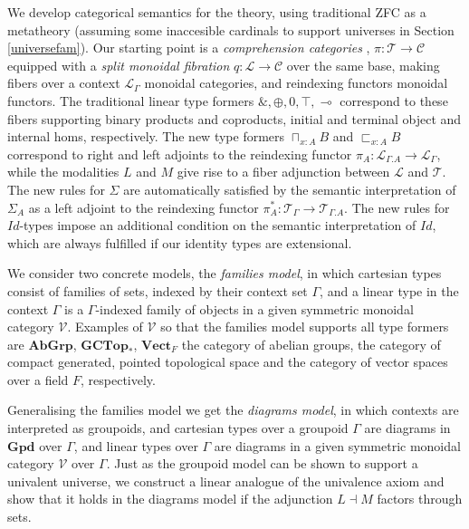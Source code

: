 We develop categorical semantics for the theory, using traditional ZFC as a metatheory (assuming some inaccesible cardinals to support universes in Section \ref{universefam}). Our starting point is a \textit{comprehension categories} \cite{jacobs}, $\pi : \mathcal{T} \to \mathcal{C}$ equipped with a \textit{split monoidal fibration} $q : \mathcal{L} \to \mathcal{C}$ over the same base, making fibers over a context $\mathcal{L}_\Gamma$ monoidal categories, and reindexing functors monoidal functors. The traditional linear type formers $\&, \oplus, 0, \top, \multimap$ correspond to these fibers supporting binary products and coproducts, initial and terminal object and internal homs, respectively. The new type formers $\sqcap_{x : A}B$ and $\sqsubset_{x :A}B$ correspond to right and left adjoints to the reindexing functor $\pi_A : \mathcal{L}_{\Gamma.A} \to \mathcal{L}_\Gamma$, while the modalities $L$ and $M$ give rise to a fiber adjunction between $\mathcal{L}$ and $\mathcal{T}$. The new rules for $\Sigma$ are automatically satisfied by the semantic interpretation of $\Sigma_A$ as a left adjoint to the reindexing functor $\pi_A^* : \mathcal{T}_\Gamma \to \mathcal{T}_{\Gamma.A}$. The new rules for $Id$-types impose an additional condition on the semantic interpretation of $Id$, which are always fulfilled if our identity types are extensional.

We consider two concrete models, the \textit{families model}, in which cartesian types consist of families of sets, indexed by their context set $\Gamma$, and a linear type in the context $\Gamma$ is a $\Gamma$-indexed family of objects in a given symmetric monoidal category $\mathcal{V}$. Examples of $\mathcal{V}$ so that the families model supports all type formers are $\mathbf{AbGrp}$, $\mathbf{GCTop}_*$, $\mathbf{Vect}_F$ the category of abelian groups, the category of compact generated, pointed topological space and the category of vector spaces over a field $F$, respectively.

Generalising the families model we get the \textit{diagrams model}, in which contexts are interpreted as groupoids, and cartesian types over a groupoid $\Gamma$ are diagrams in $\mathbf{Gpd}$ over $\Gamma$, and linear types over $\Gamma$ are diagrams in a given symmetric monoidal category $\mathcal{V}$ over $\Gamma$. Just as the groupoid model \cite{hofmann1998} can be shown to support a univalent universe, we construct a linear analogue of the univalence axiom and show that it holds in the diagrams model if the adjunction $L \dashv M$ factors through sets.

